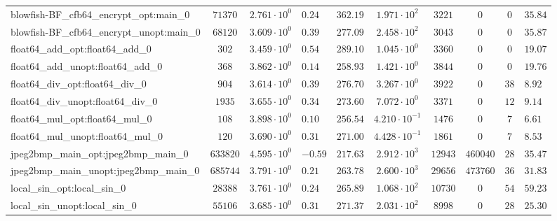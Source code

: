 \begin{tabular}{|l|c|HHc|c|c|c|cH|}
blowfish-BF\_cfb64\_encrypt\_opt:main\_0        & $ 71370    $ & $ 2.761 \cdot 10^{0} $ & $ 0.24  $ & $ 362.19 $ & $ 1.971 \cdot 10^{2}  $ & $ 3221   $ & $ 0       $ & $ 0   $ & $ 35.84   $ \\
blowfish-BF\_cfb64\_encrypt\_unopt:main\_0      & $ 68120    $ & $ 3.609 \cdot 10^{0} $ & $ 0.39  $ & $ 277.09 $ & $ 2.458 \cdot 10^{2}  $ & $ 3043   $ & $ 0       $ & $ 0   $ & $ 35.87   $ \\
float64\_add\_opt:float64\_add\_0               & $ 302      $ & $ 3.459 \cdot 10^{0} $ & $ 0.54  $ & $ 289.10 $ & $ 1.045 \cdot 10^{0}  $ & $ 3360   $ & $ 0       $ & $ 0   $ & $ 19.07   $ \\
float64\_add\_unopt:float64\_add\_0             & $ 368      $ & $ 3.862 \cdot 10^{0} $ & $ 0.14  $ & $ 258.93 $ & $ 1.421 \cdot 10^{0}  $ & $ 3844   $ & $ 0       $ & $ 0   $ & $ 19.76   $ \\
float64\_div\_opt:float64\_div\_0               & $ 904      $ & $ 3.614 \cdot 10^{0} $ & $ 0.39  $ & $ 276.70 $ & $ 3.267 \cdot 10^{0}  $ & $ 3922   $ & $ 0       $ & $ 38  $ & $ 8.92    $ \\
float64\_div\_unopt:float64\_div\_0             & $ 1935     $ & $ 3.655 \cdot 10^{0} $ & $ 0.34  $ & $ 273.60 $ & $ 7.072 \cdot 10^{0}  $ & $ 3371   $ & $ 0       $ & $ 12  $ & $ 9.14    $ \\
float64\_mul\_opt:float64\_mul\_0               & $ 108      $ & $ 3.898 \cdot 10^{0} $ & $ 0.10  $ & $ 256.54 $ & $ 4.210 \cdot 10^{-1} $ & $ 1476   $ & $ 0       $ & $ 7   $ & $ 6.61    $ \\
float64\_mul\_unopt:float64\_mul\_0             & $ 120      $ & $ 3.690 \cdot 10^{0} $ & $ 0.31  $ & $ 271.00 $ & $ 4.428 \cdot 10^{-1} $ & $ 1861   $ & $ 0       $ & $ 7   $ & $ 8.53    $ \\
jpeg2bmp\_main\_opt:jpeg2bmp\_main\_0           & $ 633820   $ & $ 4.595 \cdot 10^{0} $ & $ -0.59 $ & $ 217.63 $ & $ 2.912 \cdot 10^{3}  $ & $ 12943  $ & $ 460040  $ & $ 28  $ & $ 35.47   $ \\
jpeg2bmp\_main\_unopt:jpeg2bmp\_main\_0         & $ 685744   $ & $ 3.791 \cdot 10^{0} $ & $ 0.21  $ & $ 263.78 $ & $ 2.600 \cdot 10^{3}  $ & $ 29656  $ & $ 473760  $ & $ 36  $ & $ 31.83   $ \\
local\_sin\_opt:local\_sin\_0                   & $ 28388    $ & $ 3.761 \cdot 10^{0} $ & $ 0.24  $ & $ 265.89 $ & $ 1.068 \cdot 10^{2}  $ & $ 10730  $ & $ 0       $ & $ 54  $ & $ 59.23   $ \\
local\_sin\_unopt:local\_sin\_0                 & $ 55106    $ & $ 3.685 \cdot 10^{0} $ & $ 0.31  $ & $ 271.37 $ & $ 2.031 \cdot 10^{2}  $ & $ 8998   $ & $ 0       $ & $ 28  $ & $ 25.30   $ \\

\end{tabular}
